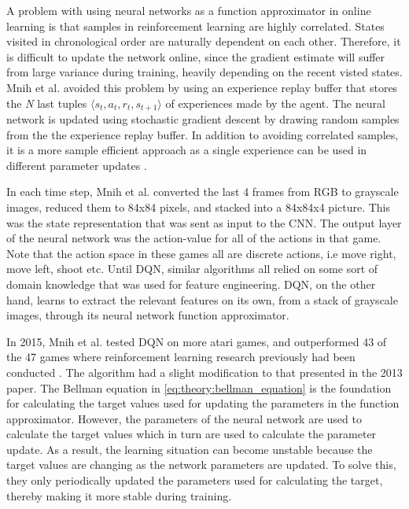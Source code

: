 \documentclass[class=book, crop=false]{standalone}
\begin{document}
A problem with using neural networks as a function approximator in online learning is that samples in reinforcement learning are highly correlated. States visited in chronological order are naturally dependent on each other. Therefore, it is difficult to update the network online, since the gradient estimate will suffer from large variance during training, heavily depending on the recent visted states. Mnih et al. avoided this problem by using an experience replay buffer that stores the \textit{N} last tuples $\langle s_{t}, a_{t}, r_{t}, s_{t+1}\rangle$ of experiences made by the agent. The neural network is updated using stochastic gradient descent by drawing random samples from the the experience replay buffer. In addition to avoiding correlated samples, it is a more sample efficient approach as a single experience can be used in different parameter updates \cite{DQN_Mnih_et_al_2013}.


In each time step, Mnih et al. converted the last 4 frames from RGB to grayscale images, reduced them to 84x84 pixels, and stacked into a 84x84x4 picture. This was the state representation that was sent as input to the CNN. The output layer of the neural network was the action-value for all of the actions in that game. Note that the action space in these games all are discrete actions, i.e move right, move left, shoot etc. Until DQN, similar algorithms all relied on some sort of domain knowledge that was used for feature engineering. DQN, on the other hand, learns to extract the relevant features on its own, from a stack of grayscale images, through its neural network function approximator.

In 2015, Mnih et al. tested DQN on more atari games, and outperformed 43 of the 47 games where reinforcement learning research previously had been conducted \cite{mnih2015_humanlevel}. The algorithm had a slight modification to that presented in the 2013 paper. The Bellman equation in \eqref{eq:theory:bellman_equation} is the foundation for calculating the target values used for updating the parameters in the function approximator. However, the parameters of the neural network are used to calculate the target values which in turn are used to calculate the parameter update. As a result, the learning situation can become unstable because the target values are changing as the network parameters are updated. To solve this, they only periodically updated the parameters used for calculating the target, thereby making it more stable during training. 
\end{document}
